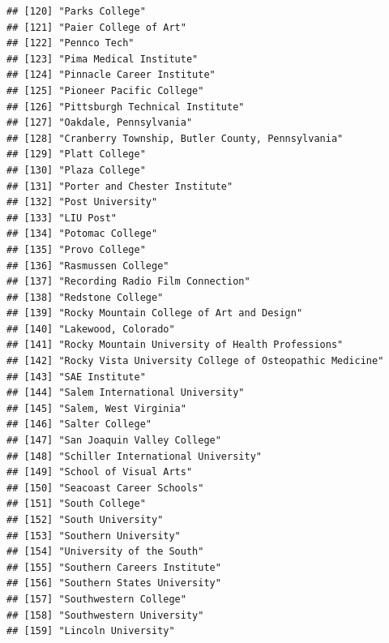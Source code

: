 \documentclass[
]{article}
\begin{document}
\begin{verbatim}
## [120] "Parks College"                                         
## [121] "Paier College of Art"                                  
## [122] "Pennco Tech"                                           
## [123] "Pima Medical Institute"                                
## [124] "Pinnacle Career Institute"                             
## [125] "Pioneer Pacific College"                               
## [126] "Pittsburgh Technical Institute"                        
## [127] "Oakdale, Pennsylvania"                                 
## [128] "Cranberry Township, Butler County, Pennsylvania"       
## [129] "Platt College"                                         
## [130] "Plaza College"                                         
## [131] "Porter and Chester Institute"                          
## [132] "Post University"                                       
## [133] "LIU Post"                                              
## [134] "Potomac College"                                       
## [135] "Provo College"                                         
## [136] "Rasmussen College"                                     
## [137] "Recording Radio Film Connection"                       
## [138] "Redstone College"                                      
## [139] "Rocky Mountain College of Art and Design"              
## [140] "Lakewood, Colorado"                                    
## [141] "Rocky Mountain University of Health Professions"       
## [142] "Rocky Vista University College of Osteopathic Medicine"
## [143] "SAE Institute"                                         
## [144] "Salem International University"                        
## [145] "Salem, West Virginia"                                  
## [146] "Salter College"                                        
## [147] "San Joaquin Valley College"                            
## [148] "Schiller International University"                     
## [149] "School of Visual Arts"                                 
## [150] "Seacoast Career Schools"                               
## [151] "South College"                                         
## [152] "South University"                                      
## [153] "Southern University"                                   
## [154] "University of the South"                               
## [155] "Southern Careers Institute"                            
## [156] "Southern States University"                            
## [157] "Southwestern College"                                  
## [158] "Southwestern University"                               
## [159] "Lincoln University"                                    

\end{verbatim}
\end{document}
